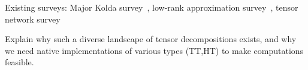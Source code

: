 Existing surveys: Major Kolda survey~\cite{Kolda09tensordecompositions}, low-rank approximation survey~\cite{larskres-survey-2013}, tensor network survey~\cite{DBLP:journals/corr/Cichocki14}

Explain why such a diverse landscape of tensor decompositions exists, and why we need native implementations of various types (TT,HT) to make computations feasible.


